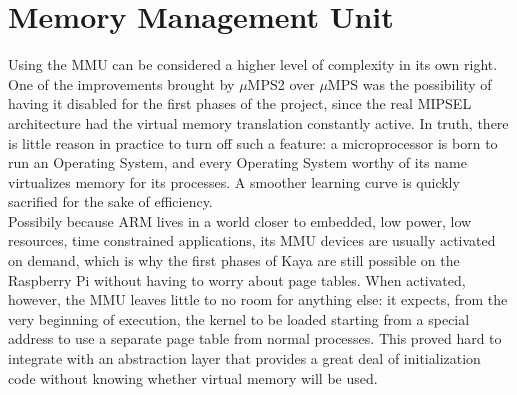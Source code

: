 \documentclass[12pt,a4paper,openright,twoside]{report}
\begin{document}
\section{Memory Management Unit}
\label{halmmu}
Using the MMU can be considered a higher level of complexity in its own right.
One of the improvements brought by $\mu$MPS2 over $\mu$MPS was the possibility 
of having it disabled for the first phases of the project, since the real 
MIPSEL architecture had the virtual memory translation constantly active.
In truth, there is little reason in practice to turn off such a feature: a microprocessor
is born to run an Operating System, and every Operating System worthy of its name
virtualizes memory for its processes. A smoother learning curve is quickly 
sacrified for the sake of efficiency.\\
Possibily because ARM lives in a world closer to embedded, low power, low resources,
time constrained applications, its MMU devices are usually activated on demand,
which is why the first phases of Kaya are still possible on the Raspberry Pi 
without having to worry about page tables.
When activated, however, the MMU leaves little to no room for anything else: it 
expects, from the very beginning of execution,
 the kernel to be loaded starting from a special address to use a separate
page table from normal processes. This proved hard to integrate with an abstraction
layer that provides a great deal of initialization code without knowing whether
virtual memory will be used.
\end{document}
